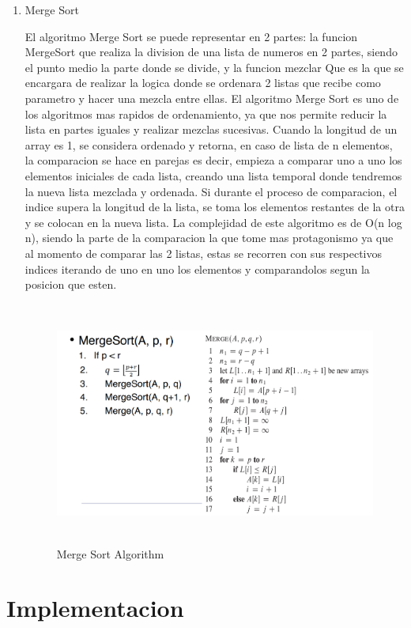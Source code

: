 \documentclass[12pt]{article} %
\begin{document}
\begin{enumerate}
    \item Merge Sort
    
          El algoritmo Merge Sort se puede representar en 2 partes: la funcion MergeSort que realiza la division de una lista de numeros en 2 partes, siendo el punto medio la parte donde se divide, y la funcion mezclar
          Que es la que se encargara de realizar la logica donde se ordenara 2 listas que recibe como parametro y hacer una mezcla entre ellas. El algoritmo Merge Sort es uno de los algoritmos mas rapidos de ordenamiento,
          ya que nos permite reducir la lista en partes iguales y realizar mezclas sucesivas. Cuando la longitud de un array es 1, se considera ordenado y retorna, en caso de lista de n elementos, la comparacion se hace en parejas
          es decir, empieza a comparar uno a uno los elementos iniciales de cada lista, creando una lista temporal donde tendremos la nueva lista mezclada y ordenada. Si durante el proceso de comparacion, el indice supera
          la longitud de la lista, se toma los elementos restantes de la otra y se colocan en la nueva lista. 
          La complejidad de este algoritmo es de O(n log n), siendo la parte de la comparacion la que tome mas protagonismo ya que al momento de comparar las 2 listas, estas se recorren con sus respectivos indices
          iterando de uno en uno los elementos y comparandolos segun la posicion que esten.

        \begin{figure}[H]
        \centering
        \includegraphics[width=12cm, height=8cm]{mergesort_pseudocode}
        \caption{Merge Sort Algorithm}
        \end{figure}

\end{enumerate}
\section{Implementacion}
\end{document}
